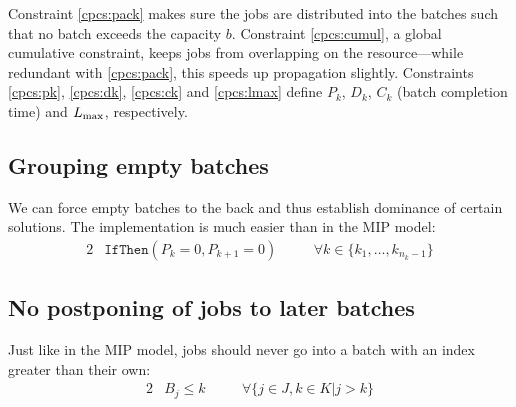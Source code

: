 \documentclass[13pt, letterpaper, oneside]{book}
\begin{document}
Constraint \eqref{cpcs:pack} makes sure the jobs are distributed into the
batches such that no batch exceeds the capacity $b$. Constraint
\eqref{cpcs:cumul}, a global cumulative constraint, keeps jobs from overlapping
on the resource---while redundant with \eqref{cpcs:pack}, this speeds up
propagation slightly. Constraints \eqref{cpcs:pk}, \eqref{cpcs:dk},
\eqref{cpcs:ck} and \eqref{cpcs:lmax} define $P_k$, $D_k$, $C_k$ (batch
completion time) and $L_{\text{max}}$, respectively.

\begin{comment}
\subsection{Temporal constraints on a job's start date} Given any partial
assignment of jobs and an open job $j$, we can reason that \begin{alist}
\item{if the first batch with a due date later than the job is $k$, then the job
cannot be part of a batch after $k$---this would result in a non-EDD sequence
of batches.} \item{if the first batches up to $k-1$ offer not enough capacity
for $j$ due to the given partial assignment, then the job cannot be part of a
batch before $k$.} \end{alist} Since batches are \textit{not} dynamically
created like in Malapert's solution but fixed from the start, any partial
assignment that fails due to these constraints cannot be part of an optimal
solution.

This constraint is redundant with both the $(C_{k+1}\geq C_k)$ and
\texttt{packing} constraints, but may help accelerate the propagation in some
cases.
\end{comment}

\subsection{Grouping empty batches} We can force
empty batches to the back and thus establish dominance of certain solutions. The
implementation is much easier than in the MIP model: 
\begin{alignat}{2} &
\mathtt{IfThen}( P_k = 0, P_{k+1} = 0 ) \quad && \forall k \in
\{k_1, \dots, k_{n_k-1}\}
\end{alignat}

\subsection{No postponing of jobs to later batches} Just like in the MIP model,
jobs should never go into a batch with an index greater than their own:
\begin{alignat}{2}
& B_j \leq k \quad && \forall \{j \in J, k \in K | j > k \}
\end{alignat}
\end{document}
